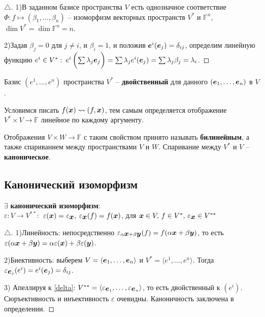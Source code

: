 \begin{proof}[$\triangle$]
	1)В заданном базисе пространства $V$ есть однозначное соответствие $\Phi \colon f \mapsto (\beta_1,\ldots,\beta_n)$ -- изоморфизм векторных пространств $V^*$ и $\mathbb{F}^n$, $\dim V^* = \dim \mathbb{F}^n = n$.

	2)Задав $\beta_j = 0$ для $j \neq i$, и $\beta_i = 1$, и положив $\mbox{\boldmath $e$}^i(\mbox{\boldmath $e$}_j) = \delta_{i j}$, определим линейную функцию $e^i \in V^*: \: e^i \left(\sum\limits_{  }^{  } \lambda_j \mbox{\boldmath $e$}_j\right) = \sum\limits_{   }^{   } \lambda_j e^i (\mbox{\boldmath $e$}_j) = \sum\limits_{   }^{   } \lambda_j \beta_j = \lambda_i$.
\end{proof}

\begin{to_def} 
	Базис $(e^1,\ldots,e^n)$ пространства $V^*$ -- \textbf{двойственный} для данного $(\mbox{\boldmath $e$}_1,\ldots, \mbox{\boldmath $e$}_n)$ в $V$.
\end{to_def}

Условимся писать $f(\mbox{\boldmath $x$}) \leadsto (f,\mbox{\boldmath $x$})$, тем самым определяется отображение $V^* \times V \to \mathbb{F}$ линейное по каждому аргументу.

Отображения $V \times W \to \mathbb{F}$ с таким свойством принято называть \textbf{билинейным}, а также спариванием между пространствами $V$ и $W$. Спаривание между $V^*$ и $V$ -- \textbf{каноническое}.

\subsection{Канонический изоморфизм}
\begin{to_thr} 
	$\exists$ \textbf{канонический изоморфизм}:\\ $\varepsilon \colon V \to V^{**}:$ $\varepsilon(\mbox{\boldmath $x$}) = \varepsilon_{\mbox{\boldmath $x$}}, \: \varepsilon_{\mbox{\boldmath $x$}} (f) = f(\mbox{\boldmath $x$})$, для $\mbox{\boldmath $x$} \in V, \, f \in V^*,\, \varepsilon_{\mbox{\boldmath $x$}} \in V^{**}$ 
\end{to_thr}

\begin{proof}[$\triangle$]
	1)Линейность: непосредственно $\varepsilon_{\alpha \mbox{\boldmath $x$} + \beta \mbox{\boldmath $y$}}(f) = f(\alpha \mbox{\boldmath $x$} + \beta \mbox{\boldmath $y$})$, то есть $\varepsilon(\alpha \mbox{\boldmath $x$} + \beta \mbox{\boldmath $y$}) = \alpha \varepsilon (\mbox{\boldmath $x$}) + \beta \varepsilon (\mbox{\boldmath $y$})$.

	2)Биективность: выберем $V = \langle \mbox{\boldmath $e$}_1,\ldots, \mbox{\boldmath $e$}_n\rangle$ и $V^* = \langle e^1,\ldots, e^n\rangle$. Тогда $\varepsilon_{\mbox{\boldmath $e$}_j}(e^i) = e^i(\mbox{\boldmath $e$}_j) = \delta_{i j}$.

	3) Апеллируя к \eqref{delta}: $V^{**} = \langle \varepsilon_{\mbox{\boldmath $e$}_1},\ldots,\varepsilon_{\mbox{\boldmath $e$}_n}\rangle$, то есть двойственный к $(e^i)$. Сюръективность и инъективность $\varepsilon$ очевидны. Каноничность заключена в определении. 
\end{proof}

